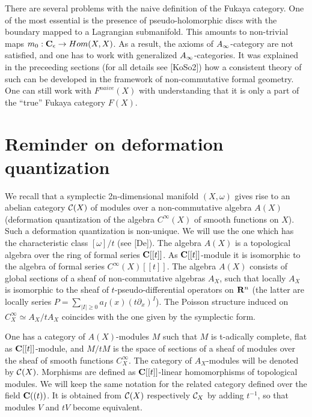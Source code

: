 \documentclass[a4paper,12pt]{article}
\begin{document}
There are several problems with the naive definition
of the Fukaya category. One of the most essential is the presence
of pseudo-holomorphic discs with the boundary mapped to a Lagrangian
submanifold. This amounts to non-trivial maps
$m_0:{\bf C}_{\epsilon}\to Hom(X,X)$. As a result, the axioms of $A_{\infty}$-category
are not satisfied, and one has to work with generalized $A_{\infty}$-categories.
It was explained in the preceeding sections (for all details see  [KoSo2]) how a
consistent theory of such can be developed
in the framework of non-commutative formal geometry.
One can still work with $F^{naive}(X)$ with understanding that it is
only a part of the ``true'' Fukaya category $F(X)$.



\section{Reminder on deformation quantization}

We recall that a symplectic 
2n-dimensional manifold $(X,\omega)$ gives rise to 
an abelian category ${\cal C}(X)$ of modules over a non-commutative
algebra $A(X)$ (deformation quantization
of the algebra $C^{\infty}(X)$ of smooth functions on $X$).
Such a deformation quantization is non-unique. We will use the one 
which has the characteristic class $[\omega]/t$ (see [De]).
The algebra $A(X)$ is a topological algebra over 
the ring of formal series ${\bf C}[[t]]$. As ${\bf C}[[t]]$-module it is isomorphic
to the algebra of formal series $C^{\infty}(X)[[t]]$.
The algebra $A(X)$ 
consists of global sections of a sheaf of non-commutative algebras
$A_X$, such that locally $A_X$ is 
isomorphic to the sheaf of $t$-pseudo-differential
operators on ${\bf R}^n$ (the latter are locally series 
 $P=\sum_{|I|\ge 0}a_I(x)(t\partial_x)^I$). The Poisson structure
 induced on $C^{{\infty}}_{X}\simeq A_{X}/tA_{X}$ coincides with the 
 one given by the symplectic form.

One has a category of $A(X)$-modules $M$ 
 such that $M$ is t-adically complete,
flat as ${\bf C}[[t]]$-module, and $M/tM$ is
the space of sections of a sheaf of modules over the sheaf 
of smooth functions $C^{\infty}_X$. 
The category of $A_X$-modules  will be denoted by
${\cal C}(X)$.
 Morphisms are defined
as ${\bf C}[[t]]$-linear homomorphisms of topological modules.
We will keep the same notation for  the related category 
 defined
over the field ${\bf C}((t))$. It is obtained from
${\cal C}(X)$ respectively ${\cal C}_X$ by adding $t^{-1}$, so that modules $V$ and $tV$ become
equivalent. 
\end{document}
